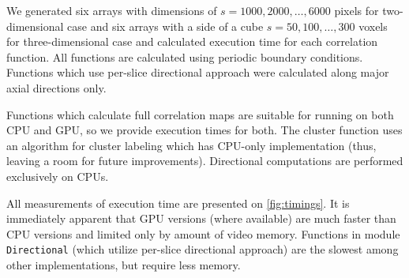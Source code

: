 \documentclass[1p]{elsarticle}
\newcommand{\code}[1]{\colorbox{light-gray}{\texttt{#1}}}
\begin{document}
We generated six arrays with dimensions of $s = 1000, 2000, \dots, 6000$ pixels
for two-dimensional case and six arrays with a side of a cube $s = 50, 100,
\dots, 300$ voxels for three-dimensional case and calculated execution time for
each correlation function. All functions are calculated using periodic boundary
conditions. Functions which use per-slice directional approach were calculated
along major axial directions only.

Functions which calculate full correlation maps are suitable for running on both
CPU and GPU, so we provide execution times for both. The cluster function uses
an algorithm for cluster labeling which has CPU-only implementation (thus,
leaving a room for future improvements). Directional computations are performed
exclusively on CPUs.

All measurements of execution time are presented on \cref{fig:timings}. It is
immediately apparent that GPU versions (where available) are much faster than
CPU versions and limited only by amount of video memory. Functions in module
\code{Directional} (which utilize per-slice directional approach) are the
slowest among other implementations, but require less memory.
\end{document}
